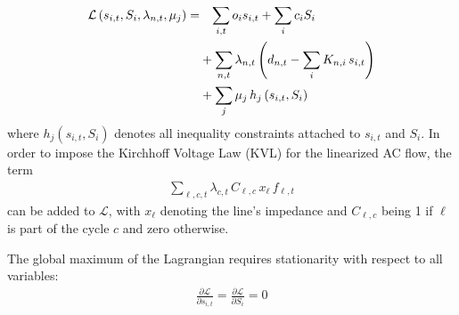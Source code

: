 \documentclass[11pt,twocolumn]{article}
\newcommand{\ubar}[1]{\underaccent{\bar}{#1}}
\newcommand{\pdv}[2]{\frac{\partial #1}{\partial #2}}
\newcommand{\state}{s_{i,t}}
\newcommand{\capacity}{S_{i}}
\newcommand{\generation}{g_{s,t}}
\newcommand{\generationpotential}{\bar{g}_{s,t}}
\newcommand{\capacitygeneration}{G_{s}}
\newcommand{\operationalpricegeneration}{o_{s}}
\newcommand{\capitalpricegeneration}{c_{s}}
\newcommand{\mulowergeneration}{\ubar{\mu}_{s,t}}
\newcommand{\muuppergeneration}{\bar{\mu}_{s,t}}
\newcommand{\flow}{f_{\ell,t}}
\newcommand{\capacityflow}{F_{\ell}}
\newcommand{\capitalpriceflow}{c_{\ell}}
\newcommand{\mulowerflow}{\ubar{\mu}_{\ell,t}}
\newcommand{\muupperflow}{\bar{\mu}_{\ell,t}}
\newcommand{\lagrangian}{\mathcal{L}}
\newcommand{\lmp}[1][n]{\lambda_{#1,t}}
\newcommand{\demand}[1][n]{d_{#1,t}}
\newcommand{\incidence}[1][n]{K_{#1,\ell}}
\newcommand{\incidencegenerator}[1][n]{K_{#1,s}}
\newcommand{\incidenceasset}[1][n]{K_{#1,i}}
\newcommand{\cycle}{C_{\ell,c}}
\newcommand{\impedance}{x_\ell}
\newcommand{\cycleprice}{\lambda_{c,t}}
\begin{document}
\begin{align}
\notag
 \lagrangian\left(\state, \capacity, \lmp, \mu_j \right) =& 
 \;\;\; \sum_{i,t} o_i \state + \sum_{i} c_i \capacity  \\
\notag
&+  \sum_{n,t} \lmp \left( \demand - \sum_i \incidenceasset \, \state \right) \\
&+ \sum_j \mu_j \, h_j \left(\state, \capacity \right)
\label{eq:full_lagrangian}
\end{align}
where $h_j \left(\state, \capacity \right)$ denotes all inequality constraints attached to $\state$ and $\capacity$.
% 
% 
In order to impose the Kirchhoff Voltage Law (KVL) for the linearized AC flow, the term 
\begin{align}
    \sum_{\ell,c,t} \cycleprice \, \cycle \, \impedance \, \flow 
\end{align}
can be added to $\lagrangian$, with $\impedance$ denoting the line's impedance and $\cycle$ being 1 if $\ell$ is part of the cycle $c$ and zero otherwise.

The global maximum of the Lagrangian requires stationarity with respect to all variables:
\begin{align}
    \pdv{\lagrangian}{\state} = \pdv{\lagrangian}{\capacity} = 0    
\end{align} 
\end{document}
